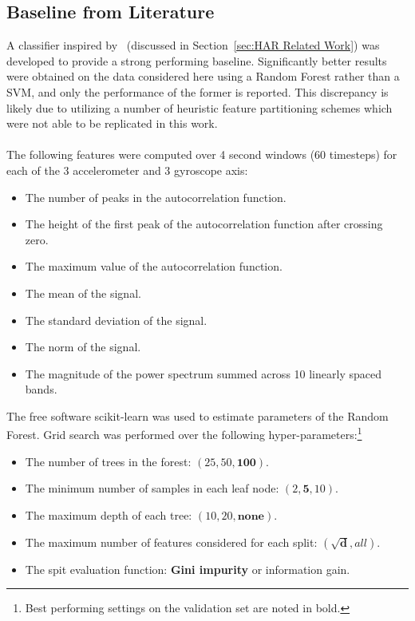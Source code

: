 \documentclass[12pt]{report}
\newcommand{\1}[0]{\mathbbm{1}}
\begin{document}
\subsection{Baseline from Literature}
A classifier inspired by~\cite{ms-activity} (discussed in Section~\ref{sec:HAR Related Work})
was developed to provide a strong performing baseline. Significantly better results were
obtained on the data considered here using a Random Forest rather than a \ac{SVM},
and only the performance of the former is reported.
This discrepancy is likely due to \cite{ms-activity} utilizing a number of heuristic feature
partitioning schemes which were not able to be replicated in this work.
\\\\
The following features were computed over 4 second windows (60 timesteps)
for each of the 3 accelerometer and 3 gyroscope axis:
\begin{itemize}[nosep]
    \item The number of peaks in the autocorrelation function.
    \item The height of the first peak of the autocorrelation function after crossing zero.
    \item The maximum value of the autocorrelation function.
    \item The mean of the signal.
    \item The standard deviation of the signal.
    \item The norm of the signal.
    \item The magnitude of the power spectrum summed across 10 linearly spaced bands.
\end{itemize}
The free software scikit-learn \cite{scikit-learn} was used
to estimate parameters of the Random Forest. Grid search was performed
over the following hyper-parameters:\footnote{
Best performing settings on the validation set are noted in bold.
}
\begin{itemize}[nosep]
    \item The number of trees in the forest: $(25, 50, \mathbf{100})$.
    \item The minimum number of samples in each leaf node: $(2, \mathbf{5}, 10)$.
    \item The maximum depth of each tree: $(10, 20, \mathbf{none})$.
    \item The maximum number of features considered for each split: $(\mathbf{\sqrt{d}}, all)$.
    \item The spit evaluation function: \textbf{Gini impurity} or information gain.
\end{itemize}
\end{document}
